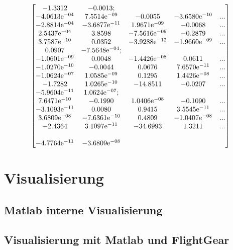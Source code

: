\begin{equation*}
\begin{bmatrix}
-1.3312 & -0.0013; & & \\ 
-4.0613\mathrm{e}^{-04} & 7.5514\mathrm{e}^{-09} & -0.0055 & -3.6580\mathrm{e}^{-10} & ... \\
-2.8814\mathrm{e}^{-04} & -3.6877\mathrm{e}^{-11} & 1.9671\mathrm{e}^{-09} & -0.0068 & ... \\
2.5437\mathrm{e}^{-04} & 3.8598 & -7.5616\mathrm{e}^{-09} & -0.2879 & ... \\
3.7587\mathrm{e}^{-10} & 0.0352 & -3.9288\mathrm{e}^{-12} & -1.9660\mathrm{e}^{-09} & ... \\
0.0907 & -7.5648\mathrm{e}^{-04}; & & \\ 
-1.0601\mathrm{e}^{-09} & 0.0048 & -1.4426\mathrm{e}^{-08} & 0.0611 & ... \\
-1.0270\mathrm{e}^{-10} & -0.0044 & 0.0676 & 7.6570\mathrm{e}^{-11} & ... \\
-1.0624\mathrm{e}^{-07} & 1.0585\mathrm{e}^{-09} & 0.1295 & 1.4426\mathrm{e}^{-08} & ... \\
-1.7282 & 1.0265\mathrm{e}^{-10} & -14.8511 & -0.0207 & ... \\
-5.9604\mathrm{e}^{-11} & 1.0624\mathrm{e}^{-07}; & & \\ 
7.6471\mathrm{e}^{-10} & -0.1990 & 1.0406\mathrm{e}^{-08} & -0.1090 & ... \\
-3.1093\mathrm{e}^{-11} & 0.0080 & 0.9415 & 3.5545\mathrm{e}^{-11} & ... \\
3.6809\mathrm{e}^{-08} & -7.6361\mathrm{e}^{-10} & 0.4809 & -1.0407\mathrm{e}^{-08} & ... \\
-2.4364 & 3.1097\mathrm{e}^{-11} & -34.6993 & 1.3211 & ... \\\\
-4.7764\mathrm{e}^{-11} & -3.6809\mathrm{e}^{-08} & &
\end{bmatrix}
\end{equation*}

\chapter{Visualisierung}\label{app:Visual}

\section{Matlab interne Visualisierung}\label{app:VisualMat}

\section{Visualisierung mit Matlab und FlightGear}\label{app:VisualFG}


